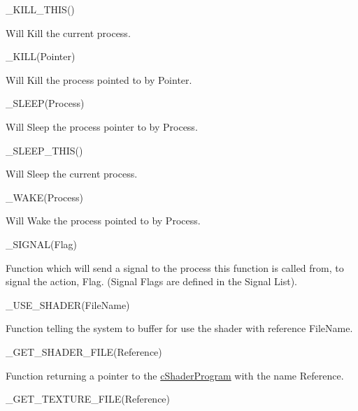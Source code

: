 \begin{DoxyItemize}
\begin{DoxyItemize}
\end{DoxyItemize}
\item \_\-KILL\_\-THIS()
\begin{DoxyItemize}
\item Will Kill the current process.
\end{DoxyItemize}
\item \_\-KILL(Pointer)
\begin{DoxyItemize}
\item Will Kill the process pointed to by Pointer.
\end{DoxyItemize}
\item \_\-SLEEP(Process)
\begin{DoxyItemize}
\item Will Sleep the process pointer to by Process.
\end{DoxyItemize}
\item \_\-SLEEP\_\-THIS()
\begin{DoxyItemize}
\item Will Sleep the current process.
\end{DoxyItemize}
\item \_\-WAKE(Process)
\begin{DoxyItemize}
\item Will Wake the process pointed to by Process.
\end{DoxyItemize}
\item \_\-SIGNAL(Flag)
\begin{DoxyItemize}
\item Function which will send a signal to the process this function is called from, to signal the action, Flag. (Signal Flags are defined in the Signal List).
\end{DoxyItemize}
\item \_\-USE\_\-SHADER(FileName)
\begin{DoxyItemize}
\item Function telling the system to buffer for use the shader with reference FileName.
\end{DoxyItemize}
\item \_\-GET\_\-SHADER\_\-FILE(Reference)
\begin{DoxyItemize}
\item Function returning a pointer to the \hyperlink{classc_shader_program}{cShaderProgram} with the name Reference.
\end{DoxyItemize}
\item \_\-GET\_\-TEXTURE\_\-FILE(Reference)
\begin{DoxyItemize}

\end{DoxyItemize}
\end{DoxyItemize}
